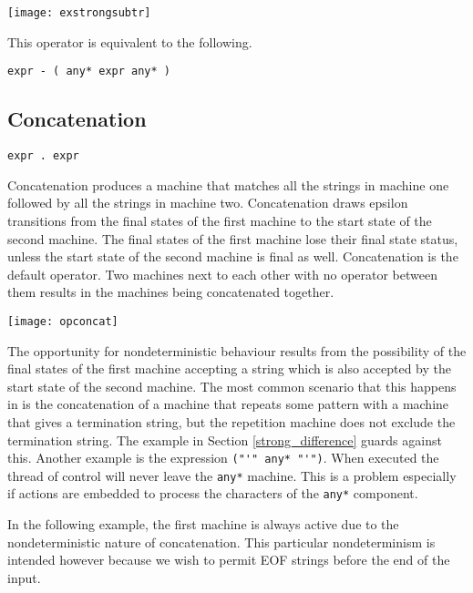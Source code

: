 \documentclass[letterpaper,11pt,oneside]{book}
\newcommand{\verbspace}{\vspace{10pt}}
\newcommand{\graphspace}{\vspace{10pt}}
\begin{document}
\graphspace
\begin{center}
\texttt{[image: exstrongsubtr]}
\end{center}
\graphspace

This operator is equivalent to the following.

\verbspace
\begin{verbatim}
expr - ( any* expr any* )
\end{verbatim}

\subsection{Concatenation}

\verb|expr . expr|
\verbspace

Concatenation produces a machine that matches all the strings in machine one followed by all
the strings in machine two.  Concatenation draws epsilon transitions from the
final states of the first machine to the start state of the second machine. The
final states of the first machine lose their final state status, unless the
start state of the second machine is final as well. 
Concatenation is the default operator. Two machines next to each other with no
operator between them results in the machines being concatenated together.  

\graphspace
\begin{center}
\texttt{[image: opconcat]}
\end{center}
\graphspace

The opportunity for nondeterministic behaviour results from the possibility of
the final states of the first machine accepting a string which is also accepted
by the start state of the second machine.
The most common scenario that this happens in is the
concatenation of a machine that repeats some pattern with a machine that gives
a termination string, but the repetition machine does not exclude the
termination string. The example in Section \ref{strong_difference}
guards against this. Another example is the expression \verb|("'" any* "'")|.
When executed the thread of control will
never leave the \verb|any*| machine.  This is a problem especially if actions
are embedded to process the characters of the \verb|any*| component.

In the following example, the first machine is always active due to the
nondeterministic nature of concatenation. This particular nondeterminism is intended
however because we wish to permit EOF strings before the end of the input.
\end{document}
